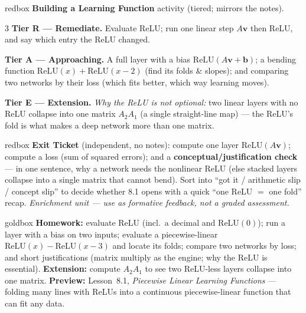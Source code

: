 \documentclass[10pt]{article}
\newcommand{\vv}{\mathbf{v}}
\newcommand{\bb}{\mathbf{b}}
\newcommand{\relu}{\mathrm{ReLU}}
\begin{document}
\begin{skillbox}{redbox}
\textbf{Building a Learning Function} activity (tiered; mirrors the notes).
\begin{multicols}{3}
\textbf{Tier R --- Remediate.} Evaluate ReLU; run one linear step $A\vv$ then ReLU, and say which entry
the ReLU changed.

\columnbreak
\textbf{Tier A --- Approaching.} A full layer with a bias $\relu(A\vv+\bb)$; a bending function
$\relu(x)+\relu(x-2)$ (find its folds \& slopes); and comparing two networks by their loss (which fits
better, which way learning moves).

\columnbreak
\textbf{Tier E --- Extension.} \emph{Why the ReLU is not optional:} two linear layers with no ReLU
collapse into one matrix $A_2A_1$ (a single straight-line map) --- the ReLU's fold is what makes a deep
network more than one matrix.
\end{multicols}
\end{skillbox}

\begin{skillbox}{redbox}
\textbf{Exit Ticket} (independent, no notes): compute one layer $\relu(A\vv)$; compute a loss (sum of
squared errors); and a \textbf{conceptual/justification check} --- in one sentence, why a network needs
the nonlinear ReLU (else stacked layers collapse into a single matrix that cannot bend). Sort into ``got
it / arithmetic slip / concept slip'' to decide whether 8.1 opens with a quick ``one ReLU $=$ one fold''
recap. \emph{Enrichment unit --- use as formative feedback, not a graded assessment.}
\end{skillbox}

\begin{skillbox}{goldbox}
\textbf{Homework:} evaluate ReLU (incl.\ a decimal and $\relu(0)$); run a layer with a bias on two inputs;
evaluate a piecewise-linear $\relu(x)-\relu(x-3)$ and locate its folds; compare two networks by loss; and
short justifications (matrix multiply as the engine; why the ReLU is essential). \textbf{Extension:}
compute $A_2A_1$ to see two ReLU-less layers collapse into one matrix. \textbf{Preview:} Lesson~8.1,
\emph{Piecewise Linear Learning Functions} --- folding many lines with ReLUs into a continuous
piecewise-linear function that can fit any data.
\end{skillbox}
\end{document}
